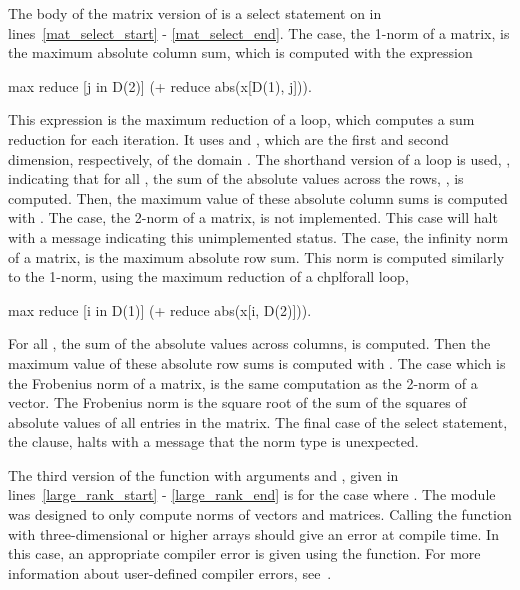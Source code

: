 The body of the matrix version of 
is a select statement on  in lines~\ref{mat_select_start} - \ref{mat_select_end}.
The  case, 
the 1-norm of a matrix, is the maximum absolute column sum, which is computed 
with the expression 
\begin{chapel}
max reduce [j in D(2)] (+ reduce abs(x[D(1), j])).
\end{chapel}
This expression is the maximum reduction of a  loop, which computes
a sum reduction for each iteration.  
It uses  and , which are the first and second dimension,
respectively, of the domain .  The shorthand version of a 
loop is used, \chpl{[j in D(2)]}, indicating that
for all , the sum
of the absolute values across the rows, , is computed. 
Then, the maximum value of these  absolute column sums is computed with
.  The  case, the 2-norm of a matrix, is not
implemented.  This case will halt with a message indicating this unimplemented
status.  The  case, the infinity norm of a matrix, is the maximum
absolute row sum.  This norm is computed similarly to the 1-norm, using the maximum
reduction of a chpl{forall} loop, 
\begin{chapel}
max reduce [i in D(1)] (+ reduce abs(x[i, D(2)])).  
\end{chapel}
For all , the sum of the absolute values across columns,
 is computed.  Then the maximum value of these
 absolute row sums is computed with .  The 
case which is the Frobenius norm of a matrix, is the same computation as the
2-norm of a vector.  The Frobenius norm is the square root of the sum of the
squares of absolute values of all entries in the matrix.  The final case of
the select statement, the  clause, halts with a message that
the norm type is unexpected.

The third version of the  function with arguments 
and , given in lines~\ref{large_rank_start} - \ref{large_rank_end} 
is for the case where .
The module was designed to only compute norms of vectors and matrices.  
Calling the  function with three-dimensional or higher arrays 
should give an error at compile time.  In this case, an appropriate compiler error 
is given using the  function.  For more information about 
user-defined compiler errors, see~.

